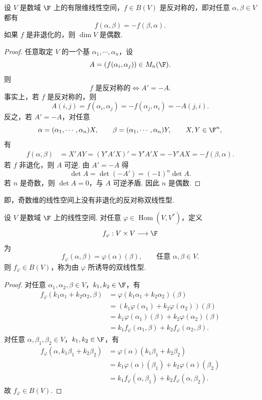 \begin{example}
	设 $V$ 是数域 $\F$ 上的有限维线性空间，$f\in B(V)$ 是反对称的，即对任意 $\alpha,\beta\in V$ 都有
	\[
	f(\alpha,\beta)=-f(\beta,\alpha).
	\]
	如果 $f$ 是非退化的，则 $\dim V$ 是偶数.
\end{example}
\begin{proof}
	任意取定 $V$ 的一个基 $\alpha_1,\cdots,\alpha_n$，设
	\[
	A=(f(\alpha_i,\alpha_j))\in M_n(\F).
	\]
	则
	\[
	f\text{ 是反对称的}\Longleftrightarrow A'=-A.
	\]
	事实上，若 $f$ 是反对称的，则
	\[
	A(i,j)=f(\alpha_i,\alpha_j)=-f(\alpha_j,\alpha_i)=-A(j,i).
	\]
	反之，若 $A'=-A$，对任意
	\[
	\alpha=(\alpha_1,	\cdots,\alpha_n)X,
	\qquad
	\beta=(\alpha_1,	\cdots,\alpha_n)Y,
	\qquad X,Y\in\F^n,
	\]
	有
	\[
	\begin{aligned}
		f(\alpha,\beta)&=X'AY=(Y'A'X)'=Y'A'X=-Y'AX=-f(\beta,\alpha).
	\end{aligned}
	\]
	若 $f$ 非退化，则 $A$ 可逆. 由 $A'=-A$ 得
	\[
	\det A=\det(-A')=(-1)^n\det A.
	\]
	若 $n$ 是奇数，则 $\det A=0$，与 $A$ 可逆矛盾. 因此 $n$ 是偶数.
\end{proof}
即，奇数维的线性空间上没有非退化的反对称双线性型.
\begin{lemma}
	设 $V$ 是数域 $\F$ 上的线性空间. 对任意 $\varphi\in\operatorname{Hom}(V,V^*)$，定义
	\[
	f_\varphi:V\times V\longrightarrow \F
	\]
	为
	\[
	f_\varphi(\alpha,\beta)=\varphi(\alpha)(\beta),\qquad \text{任意 }\alpha,\beta\in V.
	\]
	则 $f_\varphi\in B(V)$，称为由 $\varphi$ 所诱导的双线性型.
\end{lemma}
\begin{proof}
	对任意 $\alpha_1,\alpha_2,\beta\in V$，$k_1,k_2\in\F$，有
	\[
	\begin{aligned}
		f_\varphi(k_1\alpha_1+k_2\alpha_2,\beta)
		&=\varphi(k_1\alpha_1+k_2\alpha_2)(\beta)\\
		&=(k_1\varphi(\alpha_1)+k_2\varphi(\alpha_2))(\beta)\\
		&=k_1\varphi(\alpha_1)(\beta)+k_2\varphi(\alpha_2)(\beta)\\
		&=k_1f_\varphi(\alpha_1,\beta)+k_2f_\varphi(\alpha_2,\beta).
	\end{aligned}
	\]
	对任意 $\alpha,\beta_1,\beta_2\in V$，$k_1,k_2\in\F$，有
	\[
	\begin{aligned}
		f_\varphi(\alpha,k_1\beta_1+k_2\beta_2)
		&=\varphi(\alpha)(k_1\beta_1+k_2\beta_2)\\
		&=k_1\varphi(\alpha)(\beta_1)+k_2\varphi(\alpha)(\beta_2)\\
		&=k_1f_\varphi(\alpha,\beta_1)+k_2f_\varphi(\alpha,\beta_2).
	\end{aligned}
	\]
	故 $f_\varphi\in B(V)$.
\end{proof}
